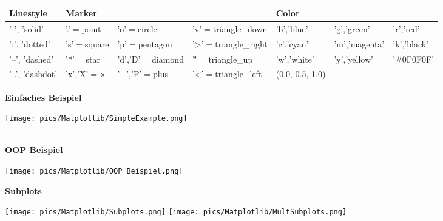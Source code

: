 \\[0.5cm]
\begin{tabular}{|l l l l l l l|}
	\hline \bfseries{Linestyle} & \bfseries{Marker} & & & \bfseries{Color} & & 
	\\\hline '-', 'solid'& '.'$=$point & 'o'$=$circle & 'v'$=$triangle\_down & 'b','blue' & 'g','green' & 'r','red'
	\\':', 'dotted' & 's'$=$square & 'p'$=$pentagon & '>'$=$triangle\_right &  'c','cyan' & 'm','magenta' & 'k','black'
	\\'--', 'dashed' & '*'$=$star & 'd','D'$=$diamond & '\^'$=$triangle\_up &  'w','white' & 'y','yellow' & '\#0F0F0F'
	\\'-.', 'dashdot' & 'x','X'$=$× & '+','P'$=$plus & '<'$=$triangle\_left & (0.0, 0.5, 1.0) & & 
	\\\hline
\end{tabular}
\newpage
\textbf{Einfaches Beispiel}
\\
\begin{minipage}[h]{10cm}
	
\end{minipage}
\begin{minipage}[h]{8cm}
	\texttt{[image: pics/Matplotlib/SimpleExample.png]}
\end{minipage}
\\[0.3cm]
\textbf{OOP Beispiel}
\\
\begin{minipage}[h]{10cm}
	
\end{minipage}
\begin{minipage}[h]{8cm}
	\texttt{[image: pics/Matplotlib/OOP\_Beispiel.png]}
\end{minipage}
\newpage
\textbf{Subplots}
\\
\begin{minipage}[h]{10cm}
	
\end{minipage}
\begin{minipage}[h]{8cm}
	\texttt{[image: pics/Matplotlib/Subplots.png]}
	\texttt{[image: pics/Matplotlib/MultSubplots.png]}
\end{minipage}
